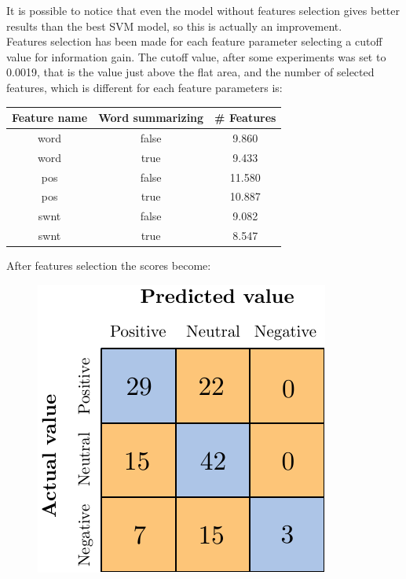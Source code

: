 It is possible to notice that even the model without features selection gives better results than the best SVM model, so this is actually an improvement.\\
Features selection has been made for each feature parameter selecting a cutoff value for information gain. The cutoff value, after some experiments was set to 0.0019, that is the value just above the flat area, and the number of selected features, which is different for each feature parameters is:

\begin{center}
	\begin{tabular}{ c  c  c } 
		\hline
		\textbf{Feature name} & \textbf{Word summarizing} & \textbf{\# Features} \\
		\hline
		word & false & 9.860 \\ 
		\hline
		word & true & 9.433 \\ 
		\hline
		pos & false & 11.580 \\ 
		\hline
		pos & true & 10.887 \\ 
		\hline
		swnt & false & 9.082 \\ 
		\hline
		swnt & true & 8.547 \\ 
		\hline
	\end{tabular}
\end{center}

After features selection the scores become:

\begin{figure}[H]
	\centering
	\includegraphics[scale=1]{figures/conf_matrices/ita_snt_bpef/ita_snt_bpef_afs.pdf}
	\label{fig:ita_snt_bpef_afs}
\end{figure}

